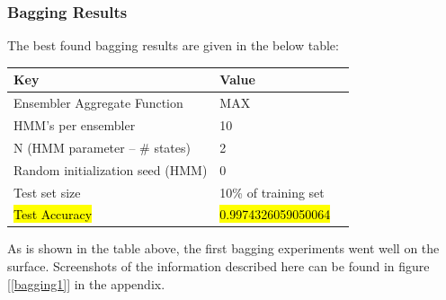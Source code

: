 \documentclass[12pt]{article}
\begin{document}
  \subsubsection{Bagging Results}
  The best found bagging results are given in the below table:
  \begin{table}[H]
    \centering
  \begin{tabular}{|l|l|l|}
    \hline \textbf{Key} & \textbf{Value} \\\hline \hline
    Ensembler Aggregate Function & \textsc{MAX}  \\ \hline
    HMM's per ensembler & 10 \\ \hline
    N (HMM parameter -- \# states) & 2 \\ \hline
    Random initialization seed (HMM) & 0 \\ \hline
    Test set size  & 10\% of training set \\ \hline
  \hl{Test Accuracy} & \hl{0.9974326059050064}  \\ \hline
  \end{tabular}
  \end{table}
  As is shown in the table above, the first bagging experiments went well on the surface. Screenshots of the information described here can be found in figure [\ref{bagging1}] in the appendix.
\end{document}
